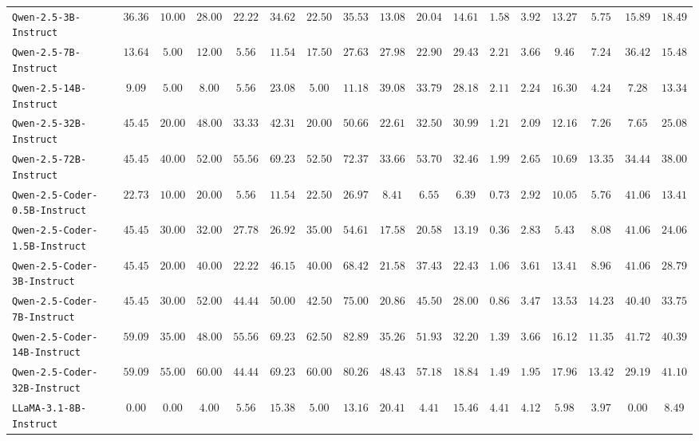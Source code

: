 \begin{table*}[]
{\begin{tabular}{lcccccccccccccccc}
\texttt{Qwen-2.5-3B-Instruct} & $36.36$ & $10.00$ & $28.00$ & $22.22$ & $34.62$ & $22.50$ & $35.53$ & $13.08$ & $20.04$ & $14.61$ & $1.58$ & $3.92$ & $13.27$ & $5.75$ & $15.89$ & $18.49$ \\
\texttt{Qwen-2.5-7B-Instruct} & $13.64$ & $5.00$ & $12.00$ & $5.56$ & $11.54$ & $17.50$ & $27.63$ & $27.98$ & $22.90$ & $29.43$ & $2.21$ & $3.66$ & $9.46$ & $7.24$ & $36.42$ & $15.48$ \\
\texttt{Qwen-2.5-14B-Instruct} & $9.09$ & $5.00$ & $8.00$ & $5.56$ & $23.08$ & $5.00$ & $11.18$ & $39.08$ & $33.79$ & $28.18$ & $2.11$ & $2.24$ & $16.30$ & $4.24$ & $7.28$ & $13.34$ \\
\texttt{Qwen-2.5-32B-Instruct} & $45.45$ & $20.00$ & $48.00$ & $33.33$ & $42.31$ & $20.00$ & $50.66$ & $22.61$ & $32.50$ & $30.99$ & $1.21$ & $2.09$ & $12.16$ & $7.26$ & $7.65$ & $25.08$ \\
\texttt{Qwen-2.5-72B-Instruct} & $45.45$ & $40.00$ & $52.00$ & $55.56$ & $69.23$ & $52.50$ & $72.37$ & $33.66$ & $53.70$ & $32.46$ & $1.99$ & $2.65$ & $10.69$ & $13.35$ & $34.44$ & $38.00$ \\
\texttt{Qwen-2.5-Coder-0.5B-Instruct} & $22.73$ & $10.00$ & $20.00$ & $5.56$ & $11.54$ & $22.50$ & $26.97$ & $8.41$ & $6.55$ & $6.39$ & $0.73$ & $2.92$ & $10.05$ & $5.76$ & $41.06$ & $13.41$ \\
\texttt{Qwen-2.5-Coder-1.5B-Instruct} & $45.45$ & $30.00$ & $32.00$ & $27.78$ & $26.92$ & $35.00$ & $54.61$ & $17.58$ & $20.58$ & $13.19$ & $0.36$ & $2.83$ & $5.43$ & $8.08$ & $41.06$ & $24.06$ \\
\texttt{Qwen-2.5-Coder-3B-Instruct} & $45.45$ & $20.00$ & $40.00$ & $22.22$ & $46.15$ & $40.00$ & $68.42$ & $21.58$ & $37.43$ & $22.43$ & $1.06$ & $3.61$ & $13.41$ & $8.96$ & $41.06$ & $28.79$ \\
\texttt{Qwen-2.5-Coder-7B-Instruct} & $45.45$ & $30.00$ & $52.00$ & $44.44$ & $50.00$ & $42.50$ & $75.00$ & $20.86$ & $45.50$ & $28.00$ & $0.86$ & $3.47$ & $13.53$ & $14.23$ & $40.40$ & $33.75$ \\
\texttt{Qwen-2.5-Coder-14B-Instruct} & $59.09$ & $35.00$ & $48.00$ & $55.56$ & $69.23$ & $62.50$ & $82.89$ & $35.26$ & $51.93$ & $32.20$ & $1.39$ & $3.66$ & $16.12$ & $11.35$ & $41.72$ & $40.39$ \\
\texttt{Qwen-2.5-Coder-32B-Instruct} & $59.09$ & $55.00$ & $60.00$ & $44.44$ & $69.23$ & $60.00$ & $80.26$ & $48.43$ & $57.18$ & $18.84$ & $1.49$ & $1.95$ & $17.96$ & $13.42$ & $29.19$ & $41.10$ \\
\texttt{LLaMA-3.1-8B-Instruct} & $0.00$ & $0.00$ & $4.00$ & $5.56$ & $15.38$ & $5.00$ & $13.16$ & $20.41$ & $4.41$ & $15.46$ & $4.41$ & $4.12$ & $5.98$ & $3.97$ & $0.00$ & $8.49$ \\

\end{tabular}}
\end{table*}
